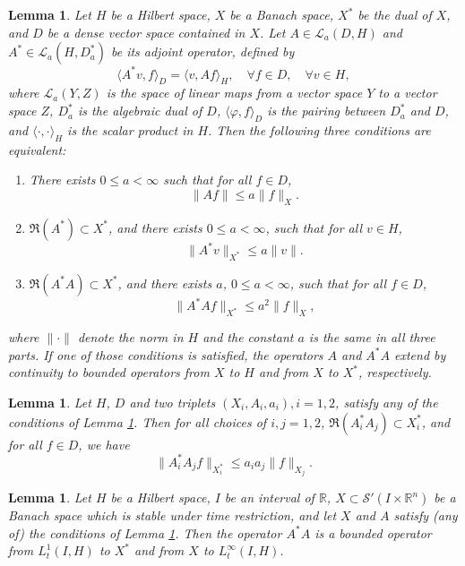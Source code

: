 \documentclass[a4paper,11pt, reqno]{amsart}
\numberwithin{equation}{section}
\theoremstyle{plain}
\newtheorem{lemma}[theorem]{Lemma}
\theoremstyle{definition}
\theoremstyle{remark}
\begin{document}
\begin{lemma}\label{equ} Let $H$ be a Hilbert space, $X$ be a Banach space, $X^*$ be the dual of $X$, and $D$ be a dense vector space contained in $X$. Let $A\in \mathcal{L}_a(D,H)$ and   $A^*\in \mathcal{L}_a(H,D_a^*)$ be its adjoint operator, defined by
	\begin{equation*}
	\langle A^*v,f \rangle_D=\langle v,Af \rangle_H, \quad \forall f\in D, \quad \forall v \in H,
	\end{equation*}
where $\mathcal{L}_a(Y,Z)$ is the space of linear maps from a vector space $Y$ to a vector space $Z$, $D^*_a$ is the algebraic dual of $D$, $\langle \varphi,f\rangle_D$ is the pairing between $D^*_a$ and $D$, and $\langle\cdot,\cdot\rangle_H$ is the scalar product in $H$. Then the following three conditions are equivalent:
\begin{enumerate}
    \item There exists  $0\leqslant a < \infty$ such that for all $f \in D$,
	\begin{equation*}
	\|Af\| \leqslant a\|f\|_X.
	\end{equation*}
 \item  $\mathfrak{R}(A^*)\subset X^*$, and there exists $0\leqslant a <\infty$, such that for all $v \in H$,
	\begin{equation*}
	\|A^*v\|_{X^*} \leqslant a\|v\|.
	\end{equation*}
 \item $\mathfrak{R}(A^*A)\subset X^*$, and there exists $a$, $0\leqslant a < \infty$, such that for all $f \in D$,
	\begin{equation*}
	\|A^*Af\|_{X^*} \leqslant a^2\|f\|_X,
	\end{equation*}
\end{enumerate}
where $\|\cdot\|$ denote the norm in $H$ and the constant $a$ is the same in all three parts. If one of those conditions is satisfied, the operators $A$ and $A^*A$ extend by continuity to bounded operators from $X$ to $H$ and from $X$ to $X^*$, respectively.
\end{lemma}
\begin{lemma} \label{DuilatyXX} Let $H$, $D$ and two triplets $(X_i,A_i,a_i), i=1,2$, satisfy any of the conditions of Lemma \ref{equ}. Then for all choices of $i,j=1,2$, $\mathfrak{R}(A_i^*A_j) \subset X_i^*$, and for all $f \in D$, we have
	\begin{equation*}
	\|A_i^* A_jf\|_{X_i^*} \leqslant a_i a_j\|f\|_{X_j}.
	\end{equation*}
\end{lemma}
\begin{lemma}\label{L1LW}  Let $H$ be a Hilbert space, $I$ be an interval of $\mathbb{R}$,    $X \subset \mathcal{S}'(I \times \mathbb{R}^n)$ be a Banach space which is stable under time restriction, and let $X$ and $A$ satisfy (any of) the conditions of Lemma \ref{equ}. Then the operator $A^*A$ is a bounded operator from $L_t^1(I,H)$ to $X^*$ and from $X$ to $L_t^\infty(I,H)$.
\end{lemma}
\end{document}
